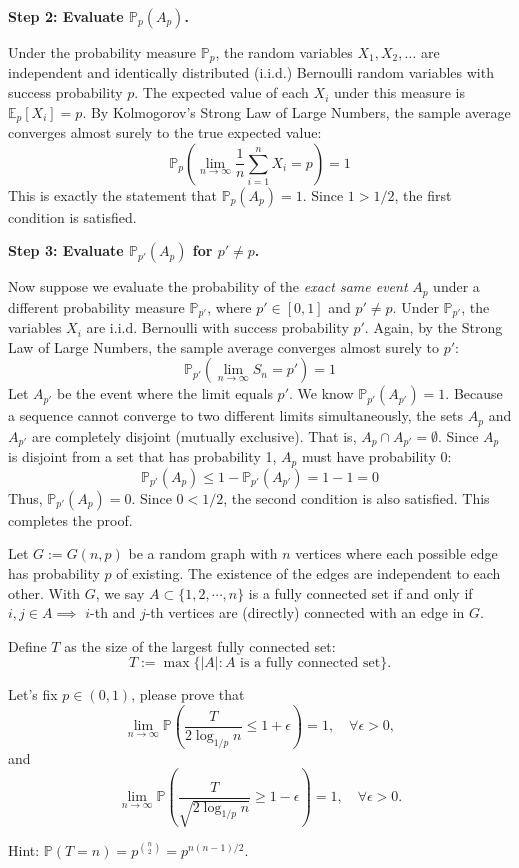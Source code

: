 \begin{solution}
\textbf{Step 2: Evaluate $\mathbb{P}_p(A_p)$.}

Under the probability measure $\mathbb{P}_p$, the random variables $X_1, X_2, \dots$ are independent and identically distributed (i.i.d.) Bernoulli random variables with success probability $p$.
The expected value of each $X_i$ under this measure is $\mathbb{E}_p[X_i] = p$.
By Kolmogorov's Strong Law of Large Numbers, the sample average converges almost surely to the true expected value:
\[ \mathbb{P}_p \left( \lim_{n \to \infty} \frac{1}{n} \sum_{i=1}^n X_i = p \right) = 1 \]
This is exactly the statement that $\mathbb{P}_p(A_p) = 1$.
Since $1 > 1/2$, the first condition is satisfied.

\textbf{Step 3: Evaluate $\mathbb{P}_{p'}(A_p)$ for $p' \neq p$.}

Now suppose we evaluate the probability of the \textit{exact same event} $A_p$ under a different probability measure $\mathbb{P}_{p'}$, where $p' \in [0, 1]$ and $p' \neq p$.
Under $\mathbb{P}_{p'}$, the variables $X_i$ are i.i.d. Bernoulli with success probability $p'$.
Again, by the Strong Law of Large Numbers, the sample average converges almost surely to $p'$:
\[ \mathbb{P}_{p'} \left( \lim_{n \to \infty} S_n = p' \right) = 1 \]
Let $A_{p'}$ be the event where the limit equals $p'$. We know $\mathbb{P}_{p'}(A_{p'}) = 1$.
Because a sequence cannot converge to two different limits simultaneously, the sets $A_p$ and $A_{p'}$ are completely disjoint (mutually exclusive). That is, $A_p \cap A_{p'} = \emptyset$.
Since $A_p$ is disjoint from a set that has probability 1, $A_p$ must have probability 0:
\[ \mathbb{P}_{p'}(A_p) \leq 1 - \mathbb{P}_{p'}(A_{p'}) = 1 - 1 = 0 \]
Thus, $\mathbb{P}_{p'}(A_p) = 0$.
Since $0 < 1/2$, the second condition is also satisfied. 
This completes the proof.
\end{solution}

\begin{exercise}\label{probability:2018:4}
Let $G := G(n,p)$ be a random graph with $n$ vertices where each possible edge has probability $p$ of existing. The existence of the edges are independent to each other. With $G$, we say $A \subset \{1,2,\cdots,n\}$ is a fully connected set if and only if $i, j \in A \implies$ $i$-th and $j$-th vertices are (directly) connected with an edge in $G$.

Define $T$ as the size of the largest fully connected set:
\[
T := \max\{|A|: A \text{ is a fully connected set}\}.
\]

Let's fix $p \in (0,1)$, please prove that
\[
\lim_{n \to \infty} \mathbb{P}\left(\frac{T}{2\log_{1/p} n} \leq 1 + \epsilon\right) = 1, \quad \forall \epsilon > 0,
\]
and
\[
\lim_{n \to \infty} \mathbb{P}\left(\frac{T}{\sqrt{2\log_{1/p} n}} \geq 1 - \epsilon\right) = 1, \quad \forall \epsilon > 0.
\]

Hint: $\mathbb{P}(T = n) = p^{\binom{n}{2}} = p^{n(n-1)/2}$.

%

%

%

%
\end{exercise}

